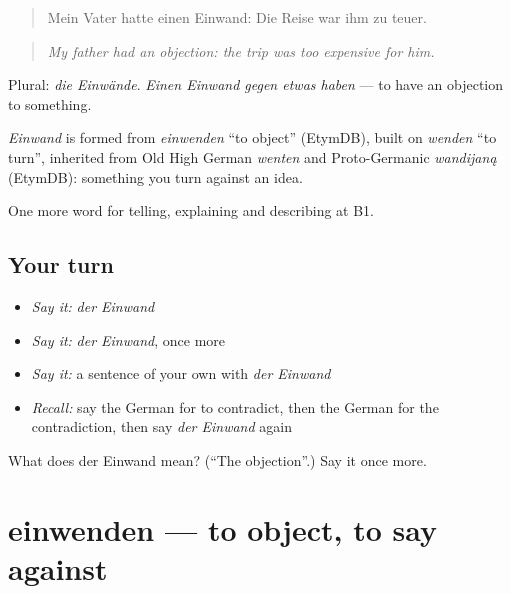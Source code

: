 \begin{quote}
Mein Vater hatte einen Einwand: Die Reise war ihm zu teuer.
\end{quote}

\begin{quote}
\emph{My father had an objection: the trip was too expensive for him.}
\end{quote}

Plural: \emph{die Einwände}. \emph{Einen Einwand gegen etwas haben} — to have an objection to something.

\begin{cousinweb}
\emph{Einwand} is formed from \emph{einwenden} \textquotedblleft{}to object\textquotedblright{} (EtymDB), built on \emph{wenden} \textquotedblleft{}to turn\textquotedblright{}, inherited from Old High German \emph{wenten} and Proto-Germanic \emph{wandijaną} (EtymDB): something you turn against an idea.
\end{cousinweb}

\begin{grammarlens}[title={What you've built}]
One more word for telling, explaining and describing at B1.
\end{grammarlens}

\subsection*{Your turn}
\begin{itemize}
\raggedright
  \item \emph{Say it:} \emph{der Einwand}
  \item \emph{Say it:} \emph{der Einwand}, once more
  \item \emph{Say it:} a sentence of your own with \emph{der Einwand}
  \item \emph{Recall:} say the German for to contradict, then the German for the contradiction, then say \emph{der Einwand} again
\end{itemize}

\begin{tcolorbox}[breakable,colback=teal!4,colframe=teal!35!black,title={Before you move on}]
What does der Einwand mean? (\textquotedblleft{}The objection\textquotedblright{}.) Say it once more.
\end{tcolorbox}
\section[einwenden]{einwenden — to object, to say against}

